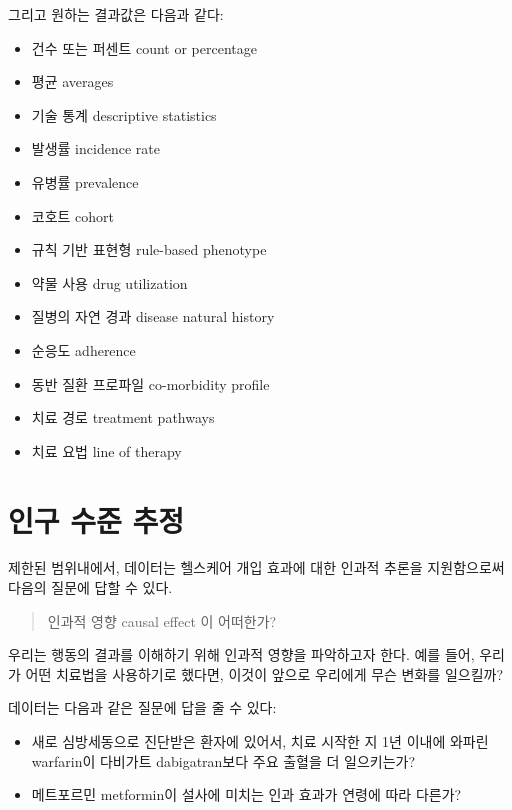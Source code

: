 \documentclass[10.5pt]{book}
\providecommand{\tightlist}{%
  \setlength{\itemsep}{0pt}\setlength{\parskip}{0pt}}
\theoremstyle{definition}
\theoremstyle{definition}
\theoremstyle{definition}
\theoremstyle{remark}
\begin{document}
그리고 원하는 결과값은 다음과 같다:

\begin{itemize}
\tightlist
\item
  건수 또는 퍼센트 count or percentage
\item
  평균 averages
\item
  기술 통계 descriptive statistics
\item
  발생률 incidence rate
\item
  유병률 prevalence
\item
  코호트 cohort
\item
  규칙 기반 표현형 rule-based phenotype
\item
  약물 사용 drug utilization
\item
  질병의 자연 경과 disease natural history
\item
  순응도 adherence
\item
  동반 질환 프로파일 co-morbidity profile
\item
  치료 경로 treatment pathways
\item
  치료 요법 line of therapy
\end{itemize}

\section{인구 수준 추정}\label{--}


제한된 범위내에서, 데이터는 헬스케어 개입 효과에 대한 인과적 추론을
지원함으로써 다음의 질문에 답할 수 있다.

\begin{quote}
인과적 영향 causal effect 이 어떠한가?
\end{quote}

우리는 행동의 결과를 이해하기 위해 인과적 영향을 파악하고자 한다. 예를
들어, 우리가 어떤 치료법을 사용하기로 했다면, 이것이 앞으로 우리에게
무슨 변화를 일으킬까?

데이터는 다음과 같은 질문에 답을 줄 수 있다:

\begin{itemize}
\tightlist
\item
  새로 심방세동으로 진단받은 환자에 있어서, 치료 시작한 지 1년 이내에
  와파린 warfarin이 다비가트 dabigatran보다 주요 출혈을 더 일으키는가?
\item
  메트포르민 metformin이 설사에 미치는 인과 효과가 연령에 따라 다른가?
\end{itemize}
\end{document}
